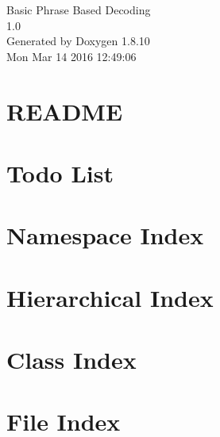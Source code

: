 \documentclass[twoside]{book}
\newcommand{\+}{\discretionary{\mbox{\scriptsize$\hookleftarrow$}}{}{}}
\newcommand{\clearemptydoublepage}{%
  \newpage{\pagestyle{empty}\cleardoublepage}%
}
\begin{document}
\hypersetup{pageanchor=false,
             bookmarks=true,
             bookmarksnumbered=true,
             pdfencoding=unicode
            }
\begin{titlepage}
\vspace*{7cm}
\begin{center}%
{\Large Basic Phrase Based Decoding \\[1ex]\large 1.\+0 }\\
\vspace*{1cm}
{\large Generated by Doxygen 1.8.10}\\
\vspace*{0.5cm}
{\small Mon Mar 14 2016 12:49:06}\\
\end{center}
\end{titlepage}
\clearemptydoublepage
\tableofcontents
\clearemptydoublepage
{}
\hypersetup{pageanchor=true}

\chapter{R\+E\+A\+D\+M\+E}
\label{md__r_e_a_d_m_e}
\hypertarget{md__r_e_a_d_m_e}{}

\chapter{Todo List}
\label{todo}
\hypertarget{todo}{}

\chapter{Namespace Index}

\chapter{Hierarchical Index}

\chapter{Class Index}

\chapter{File Index}

\end{document}
